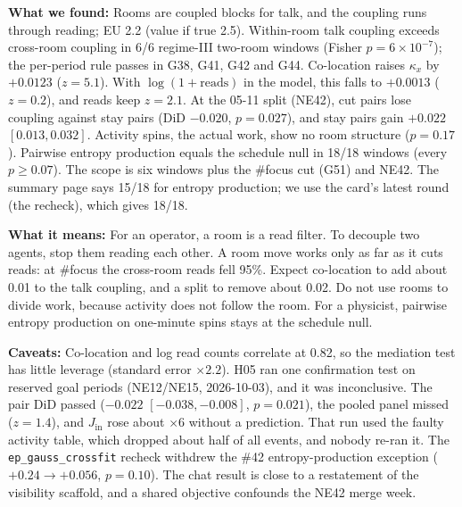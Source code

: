\textbf{What we found:} Rooms are coupled blocks for talk, and the coupling runs through reading; EU 2.2 (value if true 2.5). Within-room talk coupling exceeds cross-room coupling in 6/6 regime-III two-room windows (Fisher $p=6\times10^{-7}$); the per-period rule passes in G38, G41, G42 and G44. Co-location raises $\kappa_x$ by $+0.0123$ ($z=5.1$). With $\log(1+\text{reads})$ in the model, this falls to $+0.0013$ ($z=0.2$), and reads keep $z=2.1$. At the 05-11 split (NE42), cut pairs lose coupling against stay pairs (DiD $-0.020$, $p=0.027$), and stay pairs gain $+0.022$ $[0.013, 0.032]$. Activity spins, the actual work, show no room structure ($p=0.17$). Pairwise entropy production equals the schedule null in 18/18 windows (every $p\ge0.07$). The scope is six windows plus the \#focus cut (G51) and NE42. The summary page says 15/18 for entropy production; we use the card's latest round (the recheck), which gives 18/18.

\textbf{What it means:} For an operator, a room is a read filter. To decouple two agents, stop them reading each other. A room move works only as far as it cuts reads: at \#focus the cross-room reads fell 95\%. Expect co-location to add about 0.01 to the talk coupling, and a split to remove about 0.02. Do not use rooms to divide work, because activity does not follow the room. For a physicist, pairwise entropy production on one-minute spins stays at the schedule null.

\textbf{Caveats:} Co-location and log read counts correlate at 0.82, so the mediation test has little leverage (standard error $\times2.2$). H05 ran one confirmation test on reserved goal periods (NE12/NE15, 2026-10-03), and it was inconclusive. The pair DiD passed ($-0.022$ $[-0.038,-0.008]$, $p=0.021$), the pooled panel missed ($z=1.4$), and $J_\mathrm{in}$ rose about $\times6$ without a prediction. That run used the faulty activity table, which dropped about half of all events, and nobody re-ran it. The \texttt{ep\_gauss\_crossfit} recheck withdrew the \#42 entropy-production exception ($+0.24\to+0.056$, $p=0.10$). The chat result is close to a restatement of the visibility scaffold, and a shared objective confounds the NE42 merge week.
